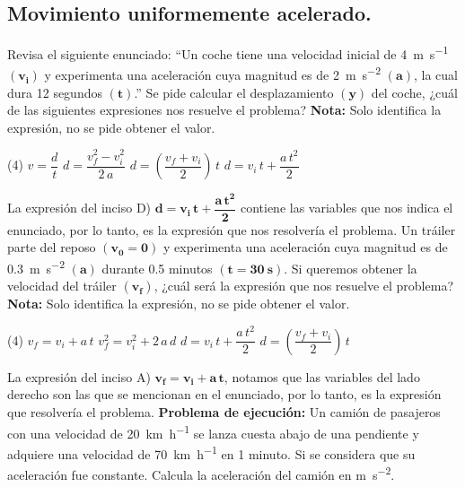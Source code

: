 \documentclass[12pt, letter]{exam}
\begin{document}


\newpage

\begin{questions}
    \section{Movimiento uniformemente acelerado.}

    \question Revisa el siguiente enunciado: \enquote{Un coche tiene una velocidad inicial de \SI{4}{\meter\per\second} $\mathbf{(v_{i})}$ y experimenta una aceleración cuya magnitud es de \SI{2}{\meter\per\square\second} $\mathbf{(a)}$, la cual dura \num{12} segundos $\mathbf{(t)}$.} Se pide calcular el desplazamiento $\mathbf{(y)}$ del coche, ¿cuál de las siguientes expresiones nos resuelve el problema? \textbf{Nota: } Solo identifica la expresión, no se pide obtener el valor.
    \begin{tasks}(4)
        \task $v = \dfrac{d}{t}$
        \task $d = \dfrac{v_{f}^{2} - v_{i}^{2}}{2 \, a}$
        \task $d = \left( \dfrac{v_{f} + v_{i}}{2} \right) \, t$
        \task $d = v_{i} \, t + \dfrac{a \, t^{2}}{2}$
    \end{tasks}
    La expresión del inciso D) $\mathbf{d = v_{i} \, t + \dfrac{a \, t^{2}}{2}}$ contiene las variables que nos indica el enunciado, por lo tanto, es la expresión que nos resolvería el problema.
    \question Un tráiler parte del reposo $\mathbf{(v_{0} = 0)}$ y experimenta una aceleración cuya magnitud es de \SI{0.3}{\meter\per\square\second} $\mathbf{(a)}$ durante \num{0.5} minutos $\mathbf{(t = \SI{30}{\second})}$. Si queremos obtener la velocidad del tráiler $\mathbf{(v_{f})}$, ¿cuál será la expresión que nos resuelve el problema? \textbf{Nota: } Solo identifica la expresión, no se pide obtener el valor.
    \begin{tasks}(4)
        \task $v_{f} = v_{i} + a \, t$
        \task $v_{f}^{2} = v_{i}^{2} + 2\, a \, d$
        \task $d = v_{i} \, t + \dfrac{a \, t^{2}}{2}$
        \task $d = \left( \dfrac{v_{f} + v_{i}}{2} \right) \, t$
    \end{tasks}
    La expresión del inciso A) $\mathbf{v_{f} = v_{i} + a \, t}$, notamos que las variables del lado derecho son las que se mencionan en el enunciado, por lo tanto, es la expresión que resolvería el problema.
    \question \label{Problema_01} \textbf{Problema de ejecución:} Un camión de pasajeros con una velocidad de \SI{20}{\kilo\meter\per\hour} se lanza cuesta abajo de una pendiente y adquiere una velocidad de \SI{70}{\kilo\meter\per\hour} en \num{1} minuto. Si se considera que su aceleración fue constante. Calcula la aceleración del camión en \unit{\meter\per\square\second}.

\end{questions}
\end{document}
